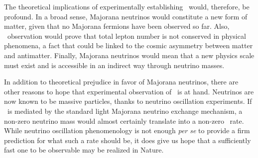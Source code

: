 The theoretical implications of experimentally establishing \bbonu\ would, therefore, be profound. In a broad sense, Majorana neutrinos would constitute a new form of matter, given that no Majorana fermions have been observed so far. Also, \bbonu\ observation would prove that total lepton number is not conserved in physical phenomena, a fact that could be linked to the cosmic asymmetry between matter and antimatter.  Finally, Majorana neutrinos would mean that a new physics scale must exist and is accessible in an indirect way through neutrino masses. 

In addition to theoretical prejudice in favor of Majorana neutrinos, there are other reasons to hope that experimental observation of \bbonu\ is at hand. Neutrinos are now known to be massive particles, thanks to neutrino oscillation experiments. If \bbonu\ is mediated by the standard light Majorana neutrino exchange mechanism, a non-zero neutrino mass would almost certainly translate into a non-zero \bbonu\ rate. While neutrino oscillation phenomenology is not enough \emph{per se} to provide a firm prediction for what such a rate should be, it does give us hope that a sufficiently fast one to be observable may be realized in Nature. 

